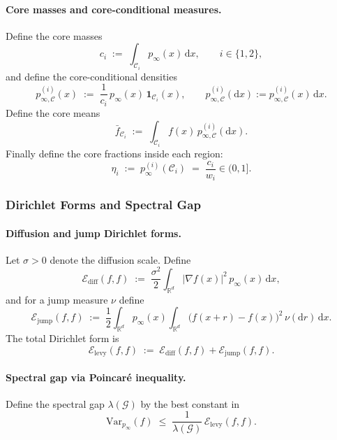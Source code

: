 \paragraph{Core masses and core-conditional measures.}
Define the core masses
\[
c_i \;:=\; \int_{\mathcal C_i} p_\infty(x)\,\mathrm dx,
\qquad i\in\{1,2\},
\]
and define the core-conditional densities
\[
p_{\infty,\mathcal C}^{(i)}(x)
\;:=\;
\frac{1}{c_i}\,p_\infty(x)\,\mathbf 1_{\mathcal C_i}(x),
\qquad
p_{\infty,\mathcal C}^{(i)}(\mathrm dx) := p_{\infty,\mathcal C}^{(i)}(x)\,\mathrm dx.
\]
Define the core means
\[
\bar f_{\mathcal C_i}
\;:=\;
\int_{\mathcal C_i} f(x)\,p_{\infty,\mathcal C}^{(i)}(\mathrm dx).
\]
Finally define the core fractions inside each region:
\[
\eta_i \;:=\; p_\infty^{(i)}(\mathcal C_i) \;=\; \frac{c_i}{w_i}\in(0,1].
\]


\subsubsection{Dirichlet Forms and Spectral Gap}\label{sec:dirichlet-gap}

\paragraph{Diffusion and jump Dirichlet forms.}
Let $\sigma>0$ denote the diffusion scale. Define
\[
\mathcal E_{\mathrm{diff}}(f,f)
\;:=\;
\frac{\sigma^2}{2}\int_{\mathbb R^d} |\nabla f(x)|^2\,p_\infty(x)\,\mathrm dx,
\]
and for a jump measure $\nu$ define
\[
\mathcal E_{\mathrm{jump}}(f,f)
\;:=\;
\frac12\int_{\mathbb R^d} p_\infty(x)
\int_{\mathbb R^d}\bigl(f(x+r)-f(x)\bigr)^2\,\nu(\mathrm dr)\,\mathrm dx.
\]
The total Dirichlet form is
\[
\mathcal E_{\mathrm{levy}}(f,f) \;:=\; \mathcal E_{\mathrm{diff}}(f,f)+\mathcal E_{\mathrm{jump}}(f,f).
\]

\paragraph{Spectral gap via Poincar\'e inequality.}
Define the spectral gap $\lambda(\mathcal G)$ by the best constant in
\[
\mathrm{Var}_{p_\infty}(f)
\;\le\;
\frac{1}{\lambda(\mathcal G)}\,\mathcal E_{\mathrm{levy}}(f,f).
\]



